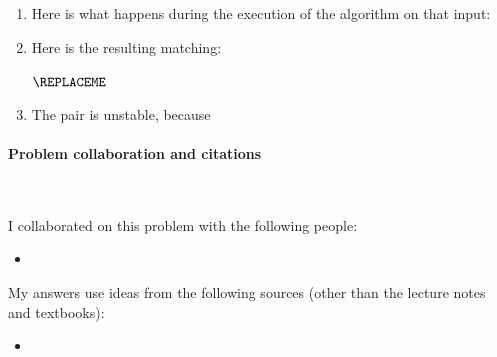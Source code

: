 \begin{enumerate}[label=(\alph*)]
\item %

  Here is what happens during the execution of the algorithm on that input:

  \begin{blue}

    \REPLACEME

  \end{blue}


\item %

  Here is the resulting matching:

  \begin{blue}
    \( \REPLACEME \)
  \end{blue}
  

\item %
  
  The pair \BLUE{
    \(\REPLACEME\)
  } is unstable, because \BLUE{
    \REPLACEME
  }
  
\end{enumerate}


\vfill

\paragraph{Problem  collaboration and citations}~

I collaborated on this problem with the following people:
\begin{blue}
  \begin{itemize}
  \item \REPLACEME                    %
  \end{itemize}
\end{blue}


My answers use ideas from the following sources (other than the lecture notes and textbooks): 
\begin{blue}
  \begin{itemize}
  \item \REPLACEME                    %
  \end{itemize}
\end{blue}
 

